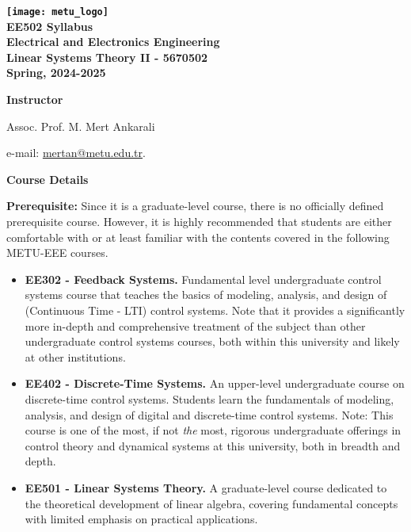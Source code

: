 \documentclass[11pt,oneside]{amsart}
\newcommand{\header}[1]{\bigbreak\textbf{#1}}
\begin{document}
\begin{center}
  \bf
  \texttt{[image: metu\_logo]} \\
  EE502 Syllabus \\
 Electrical and Electronics Engineering \\ 
Linear Systems Theory II - 5670502 \\
Spring, 2024-2025
\end{center}

\header{Instructor} 

\vspace{4pt}

Assoc. Prof. M. Mert Ankarali

e-mail: \url{mertan@metu.edu.tr}.

\header{Course Details}

\vspace{6pt}

\textbf{Prerequisite:} Since it is a graduate-level course, there is no officially defined prerequisite course. However, it is highly recommended that students are either comfortable with or at least familiar with the contents covered in the following METU-EEE courses.

\vspace{6pt}

\begin{itemize}
  \item \textbf{EE302 - Feedback Systems.} Fundamental level undergraduate control systems course that teaches the basics of modeling, analysis, and design of (Continuous Time - LTI) control systems. Note that it provides a significantly more in-depth and comprehensive treatment of the subject than other undergraduate control systems courses, both within this university and likely at other institutions.
   \item \textbf{EE402 - Discrete-Time Systems.} An upper-level undergraduate course on discrete-time control systems. Students learn the fundamentals of modeling, analysis, and design of digital and discrete-time control systems. Note: This course is one of the most, if not \textit{the} most, rigorous undergraduate offerings in control theory and dynamical systems at this university, both in breadth and depth.
   \item \textbf{EE501 - Linear Systems Theory.} A graduate-level course dedicated to the theoretical development of linear algebra, covering fundamental concepts with limited emphasis on practical applications.
\end{itemize}
\end{document}

